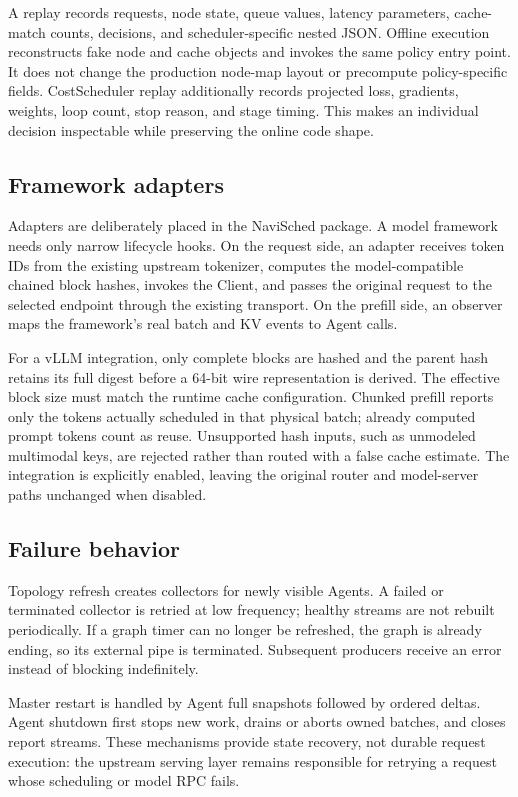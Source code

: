 \documentclass[10pt]{article}
\newcommand{\system}{NaviSched\xspace}
\begin{document}
A replay records requests, node state, queue values, latency parameters,
cache-match counts, decisions, and scheduler-specific nested JSON. Offline
execution reconstructs fake node and cache objects and invokes the same policy
entry point. It does not change the production node-map layout or precompute
policy-specific fields. CostScheduler replay additionally records projected
loss, gradients, weights, loop count, stop reason, and stage timing. This makes
an individual decision inspectable while preserving the online code shape.

\subsection{Framework adapters}

Adapters are deliberately placed in the \system package. A model framework
needs only narrow lifecycle hooks. On the request side, an adapter receives
token IDs from the existing upstream tokenizer, computes the model-compatible
chained block hashes, invokes the Client, and passes the original request to
the selected endpoint through the existing transport. On the prefill side, an
observer maps the framework's real batch and KV events to Agent calls.

For a vLLM integration, only complete blocks are hashed and the parent hash
retains its full digest before a 64-bit wire representation is derived. The
effective block size must match the runtime cache configuration. Chunked
prefill reports only the tokens actually scheduled in that physical batch;
already computed prompt tokens count as reuse. Unsupported hash inputs, such
as unmodeled multimodal keys, are rejected rather than routed with a false
cache estimate. The integration is explicitly enabled, leaving the original
router and model-server paths unchanged when disabled.

\subsection{Failure behavior}

Topology refresh creates collectors for newly visible Agents. A failed or
terminated collector is retried at low frequency; healthy streams are not
rebuilt periodically. If a graph timer can no longer be refreshed, the graph
is already ending, so its external pipe is terminated. Subsequent producers
receive an error instead of blocking indefinitely.

Master restart is handled by Agent full snapshots followed by ordered deltas.
Agent shutdown first stops new work, drains or aborts owned batches, and closes
report streams. These mechanisms provide state recovery, not durable request
execution: the upstream serving layer remains responsible for retrying a
request whose scheduling or model RPC fails.
\end{document}
